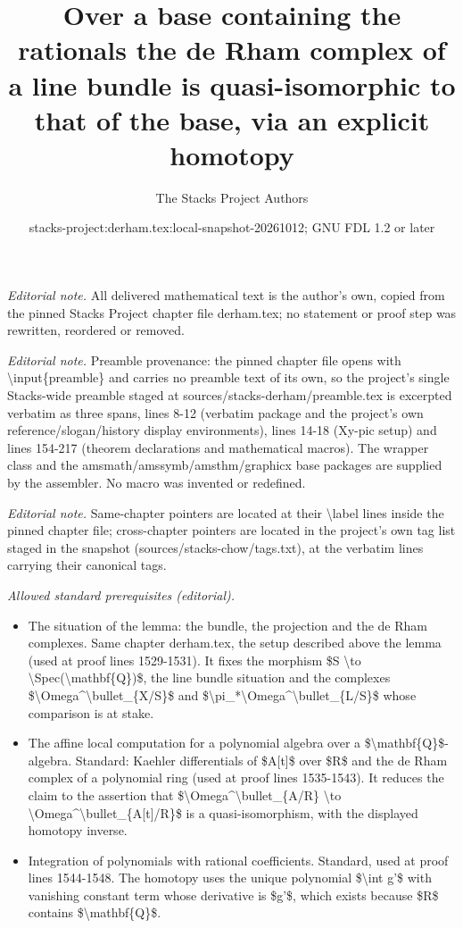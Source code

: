 \documentclass[10pt,a4paper]{amsart}
\title{Over a base containing the rationals the de Rham complex of a line bundle is quasi-isomorphic to that of the base, via an explicit homotopy}
\author{The Stacks Project Authors}
\date{stacks-project:derham.tex:local-snapshot-20261012; GNU FDL 1.2 or later}
\theoremstyle{plain}
\theoremstyle{definition}
\theoremstyle{remark}
\numberwithin{equation}{subsection}
\begin{document}
\maketitle
\noindent\textit{Editorial note.} All delivered mathematical text is the author's own, copied from the pinned Stacks Project chapter file derham.tex; no statement or proof step was rewritten, reordered or removed.\par\medskip
\noindent\textit{Editorial note.} Preamble provenance: the pinned chapter file opens with \textbackslash{}input\{preamble\} and carries no preamble text of its own, so the project's single Stacks-wide preamble staged at sources/stacks-derham/preamble.tex is excerpted verbatim as three spans, lines 8-12 (verbatim package and the project's own reference/slogan/history display environments), lines 14-18 (Xy-pic setup) and lines 154-217 (theorem declarations and mathematical macros). The wrapper class and the amsmath/amssymb/amsthm/graphicx base packages are supplied by the assembler. No macro was invented or redefined.\par\medskip
\noindent\textit{Editorial note.} Same-chapter pointers are located at their \textbackslash{}label lines inside the pinned chapter file; cross-chapter pointers are located in the project's own tag list staged in the snapshot (sources/stacks-chow/tags.txt), at the verbatim lines carrying their canonical tags.\par\medskip
\noindent\textit{Allowed standard prerequisites (editorial).}\begin{itemize}
\item The situation of the lemma: the bundle, the projection and the de Rham complexes. Same chapter derham.tex, the setup described above the lemma (used at proof lines 1529-1531). It fixes the morphism \$S \textbackslash{}to \textbackslash{}Spec(\textbackslash{}mathbf\{Q\})\$, the line bundle situation and the complexes \$\textbackslash{}Omega\textasciicircum{}\textbackslash{}bullet\_\{X/S\}\$ and \$\textbackslash{}pi\_*\textbackslash{}Omega\textasciicircum{}\textbackslash{}bullet\_\{L/S\}\$ whose comparison is at stake.
\item The affine local computation for a polynomial algebra over a \$\textbackslash{}mathbf\{Q\}\$-algebra. Standard: Kaehler differentials of \$A[t]\$ over \$R\$ and the de Rham complex of a polynomial ring (used at proof lines 1535-1543). It reduces the claim to the assertion that \$\textbackslash{}Omega\textasciicircum{}\textbackslash{}bullet\_\{A/R\} \textbackslash{}to \textbackslash{}Omega\textasciicircum{}\textbackslash{}bullet\_\{A[t]/R\}\$ is a quasi-isomorphism, with the displayed homotopy inverse.
\item Integration of polynomials with rational coefficients. Standard, used at proof lines 1544-1548. The homotopy uses the unique polynomial \$\textbackslash{}int g'\$ with vanishing constant term whose derivative is \$g'\$, which exists because \$R\$ contains \$\textbackslash{}mathbf\{Q\}\$.
\end{itemize}\medskip
\end{document}
